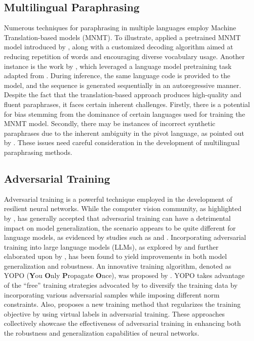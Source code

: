 \documentclass[letterpaper]{article} %
\begin{document}
\subsection{Multilingual Paraphrasing}
Numerous techniques for paraphrasing in multiple languages employ Machine Translation-based models (MNMT). To illustrate, \citet{thompson-post-2020-paraphrase} applied a pretrained MNMT model introduced by \citet{thompson-post-2020-automatic}, along with a customized decoding algorithm aimed at reducing repetition of words and encouraging diverse vocabulary usage. Another instance is the work by \citet{guo2019zeroshot}, which leveraged a language model pretraining task adapted from \citet{NEURIPS2019_c04c19c2}. During inference, the same language code is provided to the model, and the sequence is generated sequentially in an autoregressive manner. Despite the fact that the translation-based approach produces high-quality and fluent paraphrases, it faces certain inherent challenges. Firstly, there is a potential for bias stemming from the dominance of certain languages used for training the MNMT model. Secondly, there may be instances of incorrect synthetic paraphrases due to the inherent ambiguity in the pivot language, as pointed out by \citet{thompson-post-2020-paraphrase}. These issues need careful consideration in the development of multilingual paraphrasing methods.

\subsection{Adversarial Training}
Adversarial training is a powerful technique employed in the development of resilient neural networks. While the computer vision community, as highlighted by \citet{goodfellow2015explaining}, has generally accepted that adversarial training can have a detrimental impact on model generalization, the scenario appears to be quite different for language models, as evidenced by studies such as \citet{pereira-etal-2020-adversarial} and \citet{dong2021towards}. Incorporating adversarial training into large language models (LLMs), as explored by \citet{miyato2018virtual} and further elaborated upon by \citet{dong2021should}, has been found to yield improvements in both model generalization and robustness. An innovative training algorithm, denoted as YOPO (\textbf{Y}ou \textbf{O}nly \textbf{P}ropagate \textbf{O}nce), was proposed by \citet{NEURIPS2019_812b4ba2}. YOPO takes advantage of the ``free'' training strategies advocated by \citet{NEURIPS2019_7503cfac} to diversify the training data by incorporating various adversarial samples while imposing different norm constraints. Also, \citet{miyato2018virtual} proposes a new training method that regularizes the training objective by using virtual labels in adversarial training. These approaches collectively showcase the effectiveness of adversarial training in enhancing both the robustness and generalization capabilities of neural networks.
\end{document}
